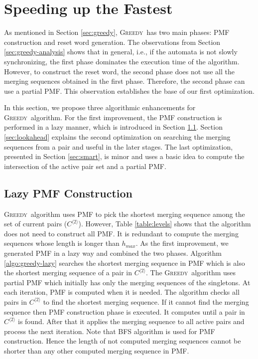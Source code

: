 \documentclass[12pt]{article}
\newcommand{\greedyAlgo}{\textsc{Greedy}}
\begin{document}
\clearpage
\section{Speeding up the Fastest}
\label{sec:speedup}

As mentioned in Section \ref{sec:greedy}, \greedyAlgo\ has two main phases: PMF construction and reset word generation. The observations from Section \ref{sec:greedy-analysis} shows that in general, i.e., if the automata is not slowly synchronizing, the first phase dominates the execution time of the algorithm. However, to construct the reset word, the second phase does not use all the merging sequences obtained in the first phase. Therefore, the second phase can use a partial PMF. This observation establishes the base of our first optimization. 

In this section, we propose three algorithmic enhancements for \greedyAlgo\ algorithm. For the first improvement, the PMF construction is performed in a lazy manner, which is introduced in Section \ref{sec:lazy}. Section \ref{sec:lookahead} explains the second optimization on searching the merging sequences from a pair and useful in the later stages. The last optimization, presented in Section \ref{sec:smart}, is minor and uses a basic idea to compute the intersection of the active pair set and a partial PMF.  

\subsection{Lazy PMF Construction}
\label{sec:lazy}

\greedyAlgo\ algorithm uses PMF to pick the shortest merging sequence among the set of current pairs ($C^{\langle2\rangle}$). However, Table \ref{table:levels} shows that the algorithm does not need to construct all PMF. It is redundant to compute the merging sequences whose length is longer than $h_{max}$. As the first improvement, we generated PMF in a lazy way and combined the two phases. Algorithm \ref{algo:greedy-lazy} searches the shortest merging sequence in PMF which is also the shortest merging sequence of a pair in $C^{\langle2\rangle}$. The \greedyAlgo\ algorithm uses partial PMF which initially has only the merging sequences of the singletons. At each iteration, PMF is computed when it is needed. The algorithm checks all pairs in $C^{\langle2\rangle}$ to find the shortest merging sequence. If it cannot find the merging sequence then PMF construction phase is executed. It computes until a pair in $C^{\langle2\rangle}$ is found. After that it applies the merging sequence to all active pairs and process the next iteration. Note that BFS algorithm is used for PMF construction. Hence the length of not computed merging sequences cannot be shorter than any other computed merging sequence in PMF.
 
\end{document}
